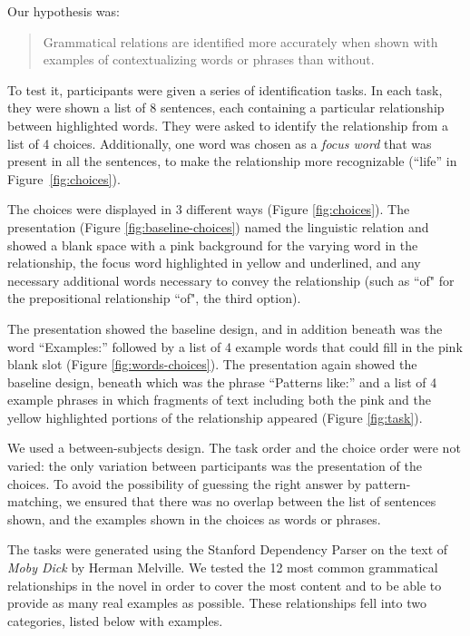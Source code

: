 Our hypothesis was:
\begin{quote}
	Grammatical relations are identified more accurately when shown with examples of contextualizing words or phrases than without.
\end{quote}

To test it, participants were given a series of identification tasks. In each task, they were shown a list of 8 sentences, each containing a particular relationship between highlighted words. They were asked to identify the relationship from a list of 4 choices.  Additionally, one word was chosen as a \emph{focus word} that was present in all the sentences, to make the relationship more recognizable (``life'' in Figure~\ref{fig:choices}).

The choices were displayed in 3 different ways (Figure \ref{fig:choices}).  The  presentation
(Figure \ref{fig:baseline-choices}) named the linguistic relation and showed a blank space with a pink background for the varying word in the relationship, the focus word highlighted in yellow and underlined, and any necessary additional words necessary to convey the relationship (such as ``of" for the prepositional relationship ``of",  the third option).

The  presentation showed the baseline design, and in addition beneath was the word ``Examples:'' followed by a list of 4 example words that could fill in the pink blank slot (Figure \ref{fig:words-choices}).   The  presentation again showed the baseline design, beneath which was the phrase ``Patterns like:'' and a list of 4 example phrases in which fragments of text including both the pink and the yellow highlighted portions of the  relationship appeared (Figure \ref{fig:task}).

We used a between-subjects design. The task order and the choice order were not varied: the only variation between participants was the presentation of the choices. To avoid the possibility of  guessing the right answer by pattern-matching, we ensured that there was no overlap between the list of sentences shown, and the examples shown in the choices as words or phrases.

The tasks were generated using the Stanford Dependency Parser \cite{de2006generating} on the text of \emph{Moby Dick} by Herman Melville. We tested the 12 most common grammatical relationships in the novel in order to cover the most content and to be able to provide as many real examples as possible. These relationships fell into two categories, listed below with examples.

